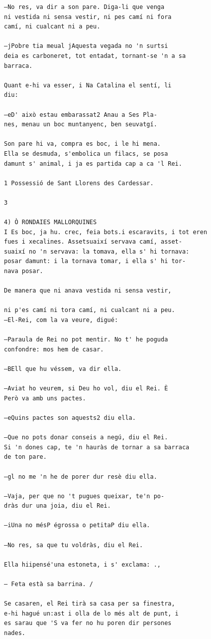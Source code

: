 \documentclass[
  letterpaper,
  DIV=11,
  numbers=noendperiod]{scrreprt}
\begin{document}
\begin{verbatim}
—No res, va dir a son pare. Diga-li que venga
ni vestida ni sensa vestir, ni pes camí ni fora
camí, ni cualcant ni a peu.

—jPobre tia meual jAquesta vegada no 'n surtsi
deia es carboneret, tot entadat, tornant-se 'n a sa
barraca.

Quant e-hi va esser, i Na Catalina el sentí, li
diu:

—eD' això estau embarassat2 Anau a Ses Pla-
nes, menau un boc muntanyenc, ben seuvatgí.

Son pare hi va, compra es boc, i le hi mena.
Ella se desmuda, s'embolica un filacs, se posa
damunt s' animal, i ja es partida cap a ca 'l Rei.

1 Possessió de Sant Llorens des Cardessar.

3

4) Ò RONDAIES MALLORQUINES
I Es boc, ja hu. crec, feia bots.i escaravits, i tot eren
fues i xecalines. Assetsuaixí servava camí, asset-
suaixí no 'n servava: la tomava, ella s' hi tornava:
posar damunt: i la tornava tomar, i ella s' hi tor-
nava posar.

De manera que ni anava vestida ni sensa vestir,

ni p'es camí ni tora camí, ni cualcant ni a peu.
—El-Rei, com la va veure, digué:

—Paraula de Rei no pot mentir. No t' he poguda
confondre: mos hem de casar.

—BEll que hu véssem, va dir ella.

—Aviat ho veurem, si Deu ho vol, diu el Rei. È
Però va amb uns pactes.

—eQuins pactes son aquests2 diu ella.

—Que no pots donar conseis a negú, diu el Rei.
Si 'n dones cap, te 'n hauràs de tornar a sa barraca
de ton pare.

—gl no me 'n he de porer dur resè diu ella.

—Vaja, per que no 't pugues queixar, te'n po-
dràs dur una joia, diu el Rei.

—iUna no mésP égrossa o petitaP diu ella.

—No res, sa que tu voldràs, diu el Rei.

Ella hiipensé'una estoneta, i s' exclama: .,

— Feta està sa barrina. /

Se casaren, el Rei tirà sa casa per sa finestra,
e-hi hagué un:ast i olla de lo més alt de punt, i
es sarau que 'S va fer no hu poren dir persones
nades.


\end{verbatim}
\end{document}
